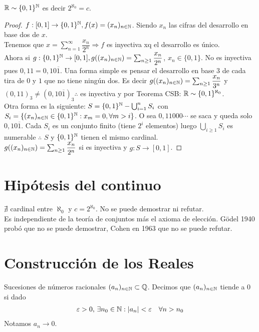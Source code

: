 \begin{theorem}
  $\mathbb{R} \sim \{ 0, 1 \}^{\mathbb{N}}$ es decir $2^{\aleph_0} = c$.
  \begin{proof}
    $f: [0, 1] \to \{ 0, 1 \}^{\mathbb{N}}, f(x) = (x_n)_{n \in \mathbb{N}}$. Siendo $x_n$ las cifras del desarrollo en base dos de $x$. \\
    Tenemos que $x = \sum_{n=1}^\infty \dfrac{x_n}{2^n} \Rightarrow f$ es inyectiva xq el desarrollo es único. \\
    Ahora si $g: \{ 0, 1 \}^{\mathbb{N}} \to [0, 1], g((x_n)_{n \in \mathbb{N}}) = \sum_{n \geq 1} \dfrac{x_n}{2^n}$, $x_n \in \{0, 1\}$. No es inyectiva pues $0,11 = 0,10\overline{1}$.
    Una forma simple es pensar el desarrollo en base $3$ de cada tira de $0$ y $1$ que no tiene ningún dos. Es decir $g((x_n)_{n \in \mathbb{N}}) = \sum_{n \geq 1} \dfrac{x_n}{3^n}$ y $(0,11)_3 \neq (0,10\overline{1})_3 \therefore$
    es inyectiva y por Teorema CSB: $\mathbb{R} \sim \{0,1\}^{\aleph_0}$. \\
    Otra forma es la siguiente:
    $S = \{0, 1\}^{\mathbb{N}} - \bigcup_{i=1}^n S_i$ con $S_i = \{ (x_n)_{n \in \mathbb{N}} \in \{0, 1\}^{\mathbb{N}} : x_m = 0, \forall m > i \}$. O sea $0,11000\cdots$ se saca y queda solo $0,10\overline{1}$.
    Cada $S_i$ es un conjunto finito (tiene $2^i$ elementos) luego $\bigcup_{i \geq 1} S_i$ es numerable $\therefore$ $S$ y $\{0,1\}^{\mathbb{N}}$ tienen el mismo cardinal. \\
    $g((x_n)_{n \in \mathbb{N}}) = \sum_{n \geq 1} \dfrac{x_n}{2^n}$ si es inyectiva y $g: S \to [0, 1]$.
  \end{proof}
\end{theorem}

\section{Hipótesis del continuo}

$\nexists$ cardinal entre $\aleph_0$ y $c = 2^{\aleph_0}$. No se puede demostrar ni refutar. \\
Es independiente de la teoría de conjuntos más el axioma de elección.
Gödel 1940 probó que no se puede demostrar, Cohen en 1963 que no se puede refutar.

\section{Construcción de los Reales}

Sucesiones de números racionales $(a_n)_{n \in \mathbb{N}} \subset \mathbb{Q}$. Decimos que $(a_n)_{n \in \mathbb{N}}$ tiende a 0 si dado \begin{align*}
  \varepsilon > 0\text{, } \exists n_0 \in \mathbb{N} : |a_n| < \varepsilon \quad \forall n > n_0
\end{align*} Notamos $a_n \to 0$.

